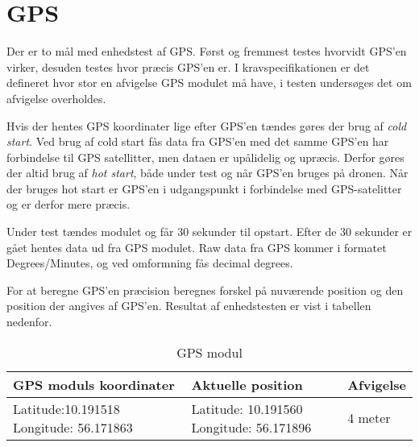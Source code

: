 \section{GPS}

Der er to mål med enhedstest af GPS. Først og fremmest testes hvorvidt GPS'en virker, desuden testes hvor præcis GPS'en er. I kravspecifikationen er det defineret hvor stor en afvigelse GPS modulet må have, i testen undersøges det om afvigelse overholdes. 

Hvis der hentes GPS koordinater lige efter GPS'en tændes gøres der brug af \textit{cold start}. Ved brug af cold start fås data fra GPS'en med det samme GPS'en har forbindelse til GPS satellitter, men dataen er upålidelig og upræcis. Derfor gøres der altid brug af \textit{hot start}, både under test og når GPS'en bruges på dronen. Når der bruges hot start er GPS'en i udgangspunkt i forbindelse med GPS-satelitter og er derfor mere præcis. 

Under test tændes modulet og får 30 sekunder til opstart. Efter de 30 sekunder er gået hentes data ud fra GPS modulet. Raw data fra GPS kommer i formatet Degrees/Minutes, og ved omformning fås decimal degrees.

For at beregne GPS'en præcision beregnes forskel på nuværende position og den position der angives af GPS'en. Resultat af enhedstesten er vist i tabellen nedenfor. 


\begin{table}[H]
\begin{tabular}{| p{5.3cm}| p{5.3cm}| p{3cm}|}
\hline
\textbf{GPS moduls koordinater} & \textbf{Aktuelle position} & \textbf{Afvigelse}\\\hline
Latitude:10.191518 \newline Longitude: 56.171863 & Latitude: 10.191560 \newline Longitude: 56.171896 & 4 meter\\\hline

\end{tabular}
\caption{GPS modul}
\label{tab:GPS_modul}
\end{table}

